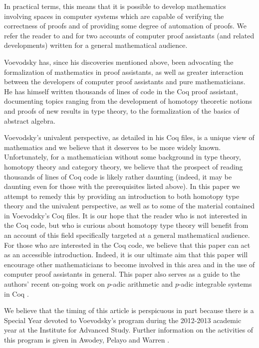 \documentclass[11pt]{amsart}
\theoremstyle{definition}
\theoremstyle{remark}
\numberwithin{equation}{section}
\begin{document}
In practical terms, this means that it is possible to
develop mathematics involving spaces in computer systems which are
capable of verifying the correctness of proofs and of providing some
degree of automation of proofs.  We refer the reader to
\cite{Simpson:2004bt} and \cite{Hales:2008ud} for two accounts of
computer proof assistants (and related developments) written for a
general mathematical audience.  

Voevodsky has, since his discoveries mentioned above, been advocating
the formalization of mathematics in proof assistants, as well as
greater interaction between the developers of computer proof
assistants and pure mathematicians. He has himself written thousands
of lines of code in the Coq proof assistant, documenting topics
ranging from the development of homotopy theoretic notions and proofs
of new results in type theory, to the formalization of the basics of
abstract algebra.

Voevodsky's univalent perspective, as detailed in his Coq files, is a
unique view of mathematics and we believe that it deserves to be more widely known.
Unfortunately, for a mathematician without some background in type
theory, homotopy theory and category theory, we believe that the
prospect of reading thousands of lines of Coq code is likely rather
daunting (indeed, it may be daunting even for those with the
prerequisites listed above).  In this paper we attempt to
remedy this by providing an introduction to both homotopy type theory
and the univalent perspective, as well as to some of the material contained
in Voevodsky's Coq files.  It is our hope that the reader who is not
interested in the Coq code, but who is curious about homotopy type
theory will benefit from an account of this field specifically
targeted at a general mathematical audience.  For those who are
interested in the Coq code, we believe that this paper can act as an
accessible introduction.  Indeed, it is our ultimate aim that this
paper will encourage other mathematicians to become involved
in this area and in the use of computer proof assistants in general.
This paper also serves as a guide to the  authors' recent on-going
work on $p$-adic arithmetic and $p$-adic integrable systems in Coq
\cite{PeVoWa2012}.

We believe that the timing of this article is perspicuous in part
because there is a Special Year devoted to Voevodsky's program
during the 2012-2013 academic year at the Institute for Advanced
Study. Further information on the activities of this program is
given in  Awodey, Pelayo and Warren \cite{AwPeWa2012}.
\end{document}
